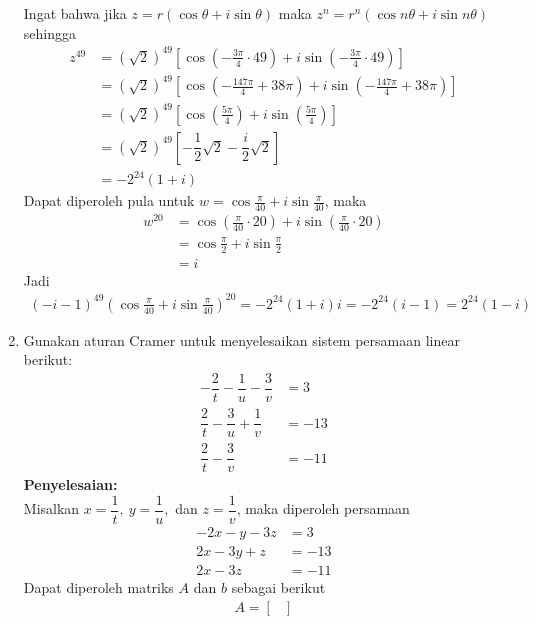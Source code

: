 \documentclass{article}
\begin{document}
\begin{enumerate}
    Ingat bahwa jika $z=r(\cos \theta +i\sin \theta)$ maka $z^n = r^n (\cos n\theta+i\sin n\theta)$ sehingga 
    \begin{align*}
    z^{49} &=\left(\sqrt{2}\right)^{49}\left[\cos \left(-\frac{3\pi}{4}\cdot 49\right)+i\sin\left(-\frac{3\pi}{4}\cdot 49\right)\right]\\
    &= \left(\sqrt{2}\right)^{49} \left[\cos \left(-\frac{147\pi}{4}+38\pi\right)+i\sin\left(-\frac{147\pi}{4}+38\pi\right)\right]\\
    &= \left(\sqrt{2}\right)^{49} \left[\cos \left(\frac{5\pi}{4}\right)+i\sin\left(\frac{5\pi}{4}\right)\right]\\
    &= \left(\sqrt{2}\right)^{49} \left[-\dfrac{1}{2}\sqrt{2}-\dfrac{i}{2}\sqrt{2}\right]\\
    &= -2^{24}(1+i)
    \end{align*}
    Dapat diperoleh pula untuk $w=\cos \frac{\pi}{40}+i\sin \frac{\pi}{40}$, maka 
    \begin{align*}
    w^{20} &= \cos \left(\frac{\pi}{40}\cdot 20\right)+i\sin \left(\frac{\pi}{40}\cdot 20\right) \\
    &= \cos \frac{\pi}{2}+i\sin \frac{\pi}{2}\\
    &= i
    \end{align*}
    Jadi 
    \begin{align*}
    (-i-1)^{49}\left(\cos \frac{\pi}{40}+i\sin\frac{\pi}{40}\right)^{20} = -2^{24}(1+i)i = -2^{24}(i-1) = 2^{24} (1-i)
    \end{align*}
    \item Gunakan aturan Cramer untuk menyelesaikan sistem persamaan linear berikut:
    \begin{align*}
    -\dfrac{2}{t}-\dfrac{1}{u}-\dfrac{3}{v} &= 3\\
    \dfrac{2}{t}-\dfrac{3}{u}+\dfrac{1}{v} &= -13\\
    \dfrac{2}{t}-\dfrac{3}{v} &= -11
    \end{align*}
    \textbf{Penyelesaian:}\\
    Misalkan $x=\dfrac{1}{t}, ~y=\dfrac{1}{u},$ dan $z=\dfrac{1}{v}$, maka diperoleh persamaan 
    \begin{align*}
    -2x-y-3z &= 3\\
    2x-3y+z &= -13\\
    2x-3z &= -11
    \end{align*}
    Dapat diperoleh matriks $A$ dan $b$ sebagai berikut
    \begin{align*}
    A = \begin{bmatrix}

\end{bmatrix}
\end{align*}
\end{enumerate}
\end{document}
